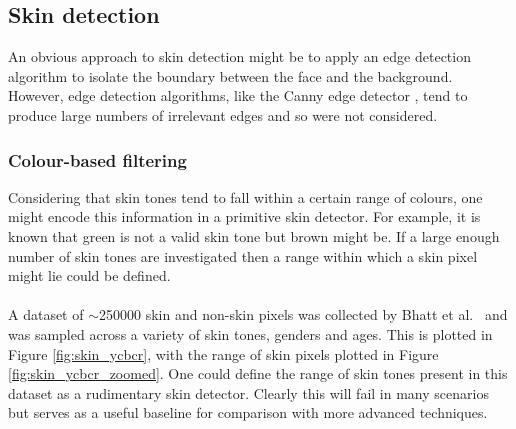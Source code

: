 \subsection{Skin detection}
 An obvious approach to skin detection might be to apply an edge detection algorithm to isolate the boundary between the face and the background. However, edge detection algorithms, like the Canny edge detector \cite{canny}, tend to produce large numbers of irrelevant edges and so were not considered.

\subsubsection{Colour-based filtering}
\label{section:colour-filter}
Considering that skin tones tend to fall within a certain range of colours, one might encode this information in a primitive skin detector. For example, it is known that green is not a valid skin tone but brown might be. If a large enough number of skin tones are investigated then a range within which a skin pixel might lie could be defined. 
\\ \\
A dataset of $\sim$250000 skin and non-skin pixels was collected by Bhatt et al.~\cite{skinDataset} and was sampled across a variety of skin tones, genders and ages. This is plotted in Figure \ref{fig:skin_ycbcr}, with the range of skin pixels plotted in Figure \ref{fig:skin_ycbcr_zoomed}. One could define the range of skin tones present in this dataset as a rudimentary skin detector. Clearly this will fail in many scenarios but serves as a useful baseline for comparison with more advanced techniques.

